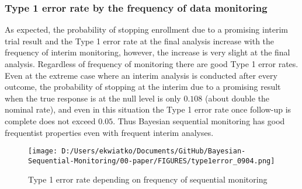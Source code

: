 \documentclass[12pt]{article}
\begin{document}
\subsubsection{Type 1 error rate by the frequency of data monitoring}
As expected, the probability of stopping enrollment due to a promising interim trial result and the Type 1 error rate at the final analysis increase with the frequency of interim monitoring, however, the increase is very slight at the final analysis. Regardless of frequency of monitoring there are good Type 1 error rates. Even at the extreme case where an interim analysis is conducted after every outcome, the probability of stopping at the interim due to a promising result when the true response is at the null level is only $0.108$ (about double the nominal rate), and even in this situation the Type 1 error rate once follow-up is complete does not exceed $0.05$. Thus Bayesian sequential monitoring has good frequentist properties even with frequent interim analyses.
\begin{figure}
\texttt{[image: D:/Users/ekwiatko/Documents/GitHub/Bayesian-Sequential-Monitoring/00-paper/FIGURES/type1error\_0904.png]}
\caption{Type 1 error rate depending on frequency of sequential monitoring}
\end{figure}
\end{document}
